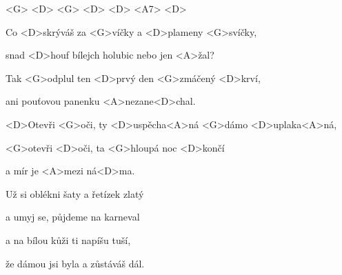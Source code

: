 

<G> <D> <G> <D> <D> <A7> <D>

\zs
Co <D>skrýváš za <G>víčky a <D>plameny <G>svíčky,

snad <D>houf bílejch holubic nebo jen <A>žal?

Tak <G>odplul ten <D>prvý den <G>zmáčený <D>krví,

ani pouťovou panenku <A>nezane<D>chal.
\ks

\zr
<D>Otevři <G>oči, ty <D>uspěcha<A>ná <G>dámo <D>uplaka<A>ná,

<G>otevři <D>oči, ta <G>hloupá noc <D>končí

a mír je <A>mezi ná<D>ma.
\kr

\zs
Už si oblékni šaty a řetízek zlatý

a umyj se, půjdeme na karneval

a na bílou kůži ti napíšu tuší,

že dámou jsi byla a zůstáváš dál.
\ks

\zr \kr

\kp






















